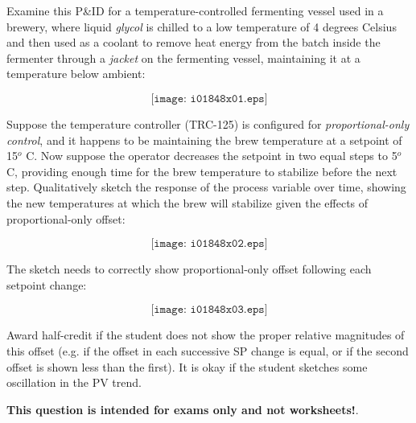 

Examine this P\&ID for a temperature-controlled fermenting vessel used in a brewery, where liquid {\it glycol} is chilled to a low temperature of 4 degrees Celsius and then used as a coolant to remove heat energy from the batch inside the fermenter through a {\it jacket} on the fermenting vessel, maintaining it at a temperature below ambient:

$$\texttt{[image: i01848x01.eps]}$$

Suppose the temperature controller (TRC-125) is configured for {\it proportional-only control}, and it happens to be maintaining the brew temperature at a setpoint of 15$^{o}$ C.  Now suppose the operator decreases the setpoint in two equal steps to 5$^{o}$ C, providing enough time for the brew temperature to stabilize before the next step.  Qualitatively sketch the response of the process variable over time, showing the new temperatures at which the brew will stabilize given the effects of proportional-only offset:

$$\texttt{[image: i01848x02.eps]}$$







The sketch needs to correctly show proportional-only offset following each setpoint change:

$$\texttt{[image: i01848x03.eps]}$$

Award half-credit if the student does not show the proper relative magnitudes of this offset (e.g. if the offset in each successive SP change is equal, or if the second offset is shown less than the first).  It is okay if the student sketches some oscillation in the PV trend.







{\bf This question is intended for exams only and not worksheets!}.



